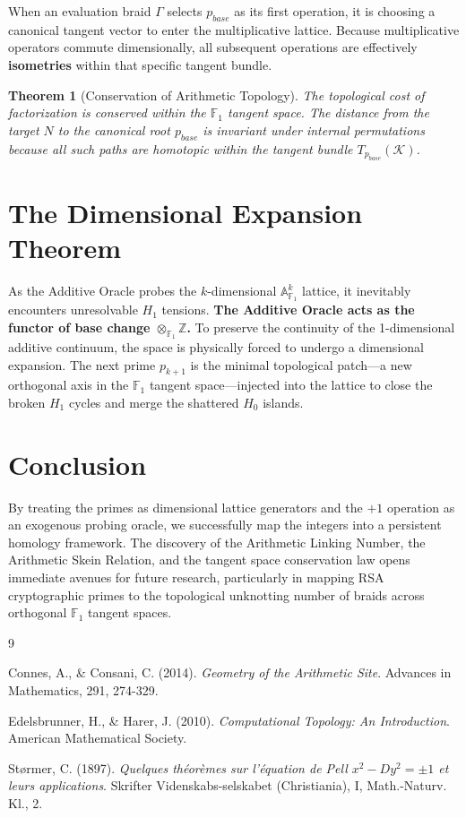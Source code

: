 \documentclass[11pt, a4paper]{article}
\newtheorem{theorem}{Theorem}[section]
\begin{document}
When an evaluation braid $\Gamma$ selects $p_{base}$ as its first operation, it is choosing a canonical tangent vector to enter the multiplicative lattice. Because multiplicative operators commute dimensionally, all subsequent operations are effectively \textbf{isometries} within that specific tangent bundle.

\begin{theorem}[Conservation of Arithmetic Topology]
The topological cost of factorization is conserved within the $\mathbb{F}_1$ tangent space. The distance from the target $N$ to the canonical root $p_{base}$ is invariant under internal permutations because all such paths are homotopic within the tangent bundle $T_{p_{base}}(\mathcal{K})$.
\end{theorem}

\section{The Dimensional Expansion Theorem}

As the Additive Oracle probes the $k$-dimensional $\mathbb{A}^k_{\mathbb{F}_1}$ lattice, it inevitably encounters unresolvable $H_1$ tensions. \textbf{The Additive Oracle acts as the functor of base change $\otimes_{\mathbb{F}_1} \mathbb{Z}$.} To preserve the continuity of the 1-dimensional additive continuum, the space is physically forced to undergo a dimensional expansion. The next prime $p_{k+1}$ is the minimal topological patch—a new orthogonal axis in the $\mathbb{F}_1$ tangent space—injected into the lattice to close the broken $H_1$ cycles and merge the shattered $H_0$ islands.

\section{Conclusion}

By treating the primes as dimensional lattice generators and the $+1$ operation as an exogenous probing oracle, we successfully map the integers into a persistent homology framework. The discovery of the Arithmetic Linking Number, the Arithmetic Skein Relation, and the tangent space conservation law opens immediate avenues for future research, particularly in mapping RSA cryptographic primes to the topological unknotting number of braids across orthogonal $\mathbb{F}_1$ tangent spaces.

\begin{thebibliography}{9}

Connes, A., \& Consani, C. (2014). \textit{Geometry of the Arithmetic Site}. Advances in Mathematics, 291, 274-329.

Edelsbrunner, H., \& Harer, J. (2010). \textit{Computational Topology: An Introduction}. American Mathematical Society.

Størmer, C. (1897). \textit{Quelques théorèmes sur l'équation de Pell $x^2 - Dy^2 = \pm 1$ et leurs applications}. Skrifter Videnskabs-selskabet (Christiania), I, Math.-Naturv. Kl., 2.

\end{thebibliography}
\end{document}

